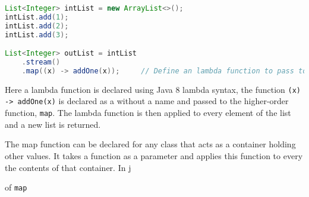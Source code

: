 \begin{lstlisting}[nolol, language=Java, label={lst:map}]
List<Integer> intList = new ArrayList<>();
intList.add(1);
intList.add(2);
intList.add(3);

List<Integer> outList = intList
    .stream()
    .map((x) -> addOne(x));     // Define an lambda function to pass to map
\end{lstlisting}

Here a lambda function is declared using Java 8 lambda syntax, the function
\lstinline{(x) -> addOne(x)} is declared as a without a name and passed to the
higher-order function, \lstinline{map}. The lambda function is then applied to
every element of the list and a new list is returned. 

The map function can be declared for any class that acts as a container holding
other values. It takes a function as a parameter and applies this function to
every the contents of that container. In j

of \lstinline{map} 


